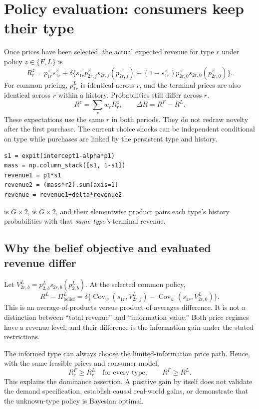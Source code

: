 \documentclass[11pt]{article}
\newcommand{\code}[1]{\texttt{\detokenize{#1}}}
\begin{document}
\section{Policy evaluation: consumers keep their type}
Once prices have been selected, the actual expected revenue for type $r$ under policy $z\in\{F,L\}$ is
\begin{equation}\label{eq:realized}
 R^z_r=p^z_{1r}s^z_{1r}+\delta\{s^z_{1r}p^z_{2r,j}s_{2r,j}(p^z_{2r,j})
       +(1-s^z_{1r})p^z_{2r,0}s_{2r,0}(p^z_{2r,0})\}.
\end{equation}
For common pricing, $p^L_{1r}$ is identical across $r$, and the terminal prices are also identical across $r$ within a history. Probabilities still differ across $r$.
\[
 R^z=\sum_rw_rR^z_r,\qquad \Delta R=R^F-R^L.
\]
These expectations use the same $r$ in both periods. They do not redraw novelty after the first purchase. The current choice shocks can be independent conditional on type while purchases are linked by the persistent type and history.

\begin{lstlisting}
s1 = expit(intercept1-alpha*p1)
mass = np.column_stack([s1, 1-s1])
revenue1 = p1*s1
revenue2 = (mass*r2).sum(axis=1)
revenue = revenue1+delta*revenue2
\end{lstlisting}
\code{mass} is $G\times2$, \code{r2} is $G\times2$, and their elementwise product pairs each type's history probabilities with that \emph{same type's} terminal revenue.

\subsection{Why the belief objective and evaluated revenue differ}
Let $V^L_{2r,b}=p^L_{2,b}s_{2r,b}(p^L_{2,b})$. At the selected common policy,
\[
 R^L-\Pi^L_{\mathrm{belief}}
 =\delta\{\operatorname{Cov}_w(s_{1r},V^L_{2r,j})
         -\operatorname{Cov}_w(s_{1r},V^L_{2r,0})\}.
\]
This is an average-of-products versus product-of-averages difference. It is not a distinction between ``total revenue'' and ``information value.'' Both price regimes have a revenue level, and their difference is the information gain under the stated restrictions.

The informed type can always choose the limited-information price path. Hence, with the same feasible prices and consumer model,
\[
 R^F_r\ge R^L_r\quad\text{for every type},\qquad R^F\ge R^L.
\]
This explains the dominance assertion. A positive gain by itself does not validate the demand specification, establish causal real-world gains, or demonstrate that the unknown-type policy is Bayesian optimal.
\end{document}
